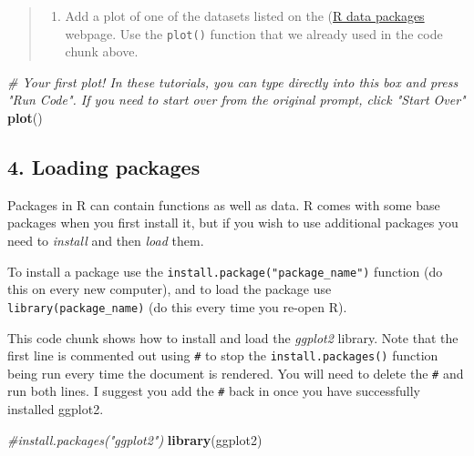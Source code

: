 \documentclass[]{article}
\newenvironment{Shaded}{\begin{snugshade}}{\end{snugshade}}
\newcommand{\CommentTok}[1]{\textcolor[rgb]{0.56,0.35,0.01}{\textit{#1}}}
\newcommand{\KeywordTok}[1]{\textcolor[rgb]{0.13,0.29,0.53}{\textbf{#1}}}
\newcommand{\NormalTok}[1]{#1}
\providecommand{\tightlist}{%
  \setlength{\itemsep}{0pt}\setlength{\parskip}{0pt}}
\begin{document}
\begin{quote}
\begin{enumerate}
\def\labelenumi{\arabic{enumi}.}
\setcounter{enumi}{4}
\tightlist
\item
  Add a plot of one of the datasets listed on the
  (\href{https://stat.ethz.ch/R-manual/R-devel/library/datasets/html/00Index.html}{R
  data packages} webpage. Use the \texttt{plot()} function that we
  already used in the code chunk above.
\end{enumerate}
\end{quote}

\begin{Shaded}
\begin{Highlighting}[]
\CommentTok{# Your first plot! In these tutorials, you can type directly into this box and press "Run Code". If you need to start over from the original prompt, click "Start Over"}
\KeywordTok{plot}\NormalTok{()}
\end{Highlighting}
\end{Shaded}

\hypertarget{loading-packages}{%
\subsection{4. Loading packages}\label{loading-packages}}

Packages in R can contain functions as well as data. R comes with some
base packages when you first install it, but if you wish to use
additional packages you need to \emph{install} and then \emph{load}
them.

To install a package use the \texttt{install.package("package\_name")}
function (do this on every new computer), and to load the package use
\texttt{library(package\_name)} (do this every time you re-open R).

This code chunk shows how to install and load the \emph{ggplot2}
library. Note that the first line is commented out using \texttt{\#} to
stop the \texttt{install.packages()} function being run every time the
document is rendered. You will need to delete the \texttt{\#} and run
both lines. I suggest you add the \texttt{\#} back in once you have
successfully installed ggplot2.

\begin{Shaded}
\begin{Highlighting}[]
\CommentTok{#install.packages("ggplot2")}
\KeywordTok{library}\NormalTok{(ggplot2)}
\end{Highlighting}
\end{Shaded}
\end{document}
